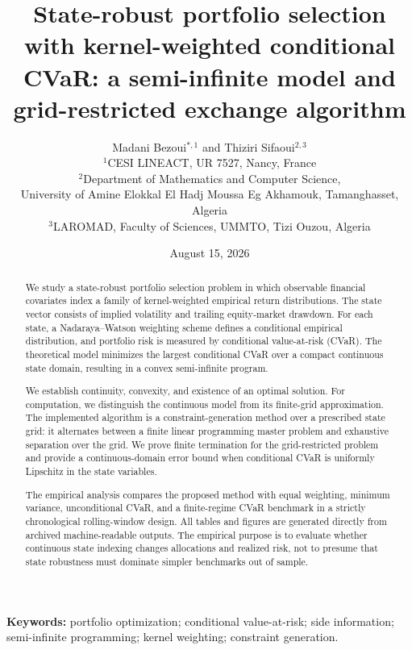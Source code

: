 \documentclass[11pt,a4paper]{article}
\title{
State-robust portfolio selection with kernel-weighted conditional CVaR:
a semi-infinite model and grid-restricted exchange algorithm
}
\author{
Madani Bezoui$^{*,1}$ and Thiziri Sifaoui$^{2,3}$\\[0.5em]
\small $^1$CESI LINEACT, UR 7527, Nancy, France\\
\small $^2$Department of Mathematics and Computer Science,\\
\small University of Amine Elokkal El Hadj Moussa Eg Akhamouk,
Tamanghasset, Algeria\\
\small $^3$LAROMAD, Faculty of Sciences, UMMTO, Tizi Ouzou, Algeria
}
\date{August 15, 2026}
\theoremstyle{definition}
\theoremstyle{remark}
\begin{document}
\maketitle

\begin{NoHyper}
\def\thefootnote{*}
\end{NoHyper}

\begin{abstract}
We study a state-robust portfolio selection problem in which observable
financial covariates index a family of kernel-weighted empirical return
distributions. The state vector consists of implied volatility and trailing
equity-market drawdown. For each state, a Nadaraya--Watson weighting scheme
defines a conditional empirical distribution, and portfolio risk is measured
by conditional value-at-risk (CVaR). The theoretical model minimizes the
largest conditional CVaR over a compact continuous state domain, resulting in
a convex semi-infinite program.

We establish continuity, convexity, and existence of an optimal solution.
For computation, we distinguish the continuous model from its finite-grid
approximation. The implemented algorithm is a constraint-generation method
over a prescribed state grid: it alternates between a finite linear programming
master problem and exhaustive separation over the grid. We prove finite
termination for the grid-restricted problem and provide a continuous-domain
error bound when conditional CVaR is uniformly Lipschitz in the state
variables.

The empirical analysis compares the proposed method with equal weighting,
minimum variance, unconditional CVaR, and a finite-regime CVaR benchmark in a
strictly chronological rolling-window design. All tables and figures are
generated directly from archived machine-readable outputs. The empirical
purpose is to evaluate whether continuous state indexing changes allocations
and realized risk, not to presume that state robustness must dominate simpler
benchmarks out of sample.
\end{abstract}

\noindent\textbf{Keywords:}
portfolio optimization; conditional value-at-risk; side information;
semi-infinite programming; kernel weighting; constraint generation.
\end{document}
